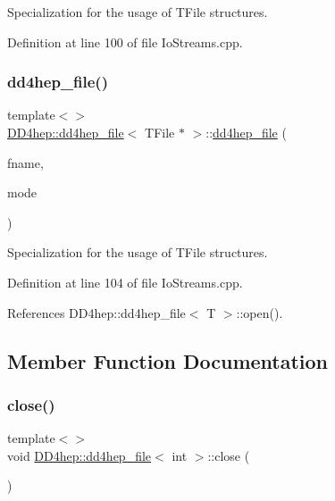 Specialization for the usage of T\+File structures. 



Definition at line 100 of file Io\+Streams.\+cpp.

\hypertarget{class_d_d4hep_1_1dd4hep__file_aa1f1a5bfdaae699856ca5bf69be37531}{}\label{class_d_d4hep_1_1dd4hep__file_aa1f1a5bfdaae699856ca5bf69be37531} 
\subsubsection{\texorpdfstring{dd4hep\+\_\+file()}{dd4hep\_file()}\hspace{0.1cm}{\footnotesize\ttfamily [7/7]}}
{\footnotesize\ttfamily template$<$$>$ \\
\hyperlink{class_d_d4hep_1_1dd4hep__file}{D\+D4hep\+::dd4hep\+\_\+file}$<$ T\+File $\ast$ $>$\+::\hyperlink{class_d_d4hep_1_1dd4hep__file}{dd4hep\+\_\+file} (\begin{DoxyParamCaption}\item[{const char $\ast$}]{fname,  }\item[{B\+O\+O\+S\+T\+\_\+\+I\+O\+S\+::openmode}]{mode }\end{DoxyParamCaption})}



Specialization for the usage of T\+File structures. 



Definition at line 104 of file Io\+Streams.\+cpp.



References D\+D4hep\+::dd4hep\+\_\+file$<$ T $>$\+::open().



\subsection{Member Function Documentation}
\hypertarget{class_d_d4hep_1_1dd4hep__file_ae2852ad5cdd51d7b2a114d0634dad993}{}\label{class_d_d4hep_1_1dd4hep__file_ae2852ad5cdd51d7b2a114d0634dad993} 
\subsubsection{\texorpdfstring{close()}{close()}\hspace{0.1cm}{\footnotesize\ttfamily [1/3]}}
{\footnotesize\ttfamily template$<$$>$ \\
void \hyperlink{class_d_d4hep_1_1dd4hep__file}{D\+D4hep\+::dd4hep\+\_\+file}$<$ int $>$\+::close (\begin{DoxyParamCaption}{ }\end{DoxyParamCaption})}




